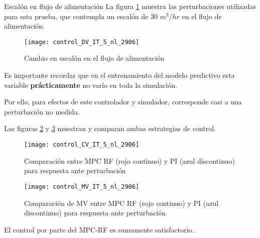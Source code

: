\documentclass{beamer}
\begin{document}
\begin{myFrame}{Escalón en flujo de alimentación}
La figura \ref{fig:control_DV_IT_5_nl_2906} muestra las perturbaciones utilizadas para esta prueba, que contempla un escalón de 30 $m^3/hr$ en el flujo de alimentación. 

\framebreak
\begin{figure}[H]
\centering
\texttt{[image: control\_DV\_IT\_5\_nl\_2906]}
\caption{Cambio en escalón en el flujo de alimentación}
\label{fig:control_DV_IT_5_nl_2906}
\end{figure}

\framebreak

Es importante recordar que en el entrenamiento del modelo predictivo esta variable \textbf{prácticamente} no varío en toda la simulación.

Por ello, para efectos de este controlador y simulador, corresponde casi a una perturbación no medida.

Las figuras \ref{fig:control_CV_IT_5_nl_2906} y \ref{fig:control_MV_IT_5_nl_2906} muestran y comparan ambas estrategias de control.

\framebreak

\begin{figure}[H]
\centering
\texttt{[image: control\_CV\_IT\_5\_nl\_2906]}
\caption{Comparación entre MPC RF (rojo continuo) y PI (azul discontinuo) para respuesta ante perturbación}
\label{fig:control_CV_IT_5_nl_2906}
\end{figure}

\framebreak
\begin{figure}[H]
\centering
\texttt{[image: control\_MV\_IT\_5\_nl\_2906]}
\caption{Comparación de MV entre MPC RF (rojo continuo) y PI (azul discontinuo) para respuesta ante perturbación}
\label{fig:control_MV_IT_5_nl_2906}
\end{figure}

\framebreak

El control por parte del MPC-RF es sumamente satisfactorio. 


\end{myFrame}
\end{document}
